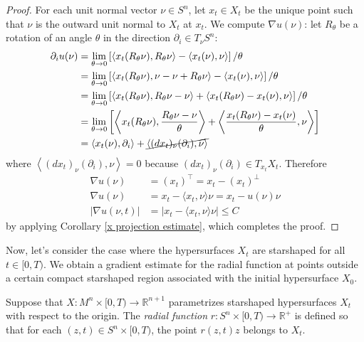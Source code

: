 \begin{proof} 
	For each unit normal vector $ \nu \in S^n $, let $ x_t \in X_t $ be the unique point such that $ \nu $ is the outward unit normal to $ X_t $ at $ x_t $. We compute $\nabla u(\nu)$: let $R_\theta$ be a rotation of an angle $\theta$ in the direction $\partial_i\in T_\nu S^n$:	
	\begin{align*}
		\partial_i u(\nu)  &= \lim_{\theta \rightarrow 0} \left[\langle x_t(R_\theta \nu) , R_\theta \nu\rangle - \langle x_t(\nu) ,  \nu\rangle\right]/\theta\\
		 &= \lim_{\theta \rightarrow 0} \left[\langle x_t(R_\theta \nu) , \nu - \nu + R_\theta \nu\rangle - \langle x_t(\nu) ,  \nu\rangle\right]/\theta\\
		 &= \lim_{\theta \rightarrow 0} \left[\langle x_t(R_\theta \nu) ,  R_\theta \nu - \nu\rangle + \langle  x_t(R_\theta \nu)  - x_t(\nu) ,  \nu\rangle\right]/\theta\\ 
		 &= \lim_{\theta \rightarrow 0}\left[ \left\langle x_t(R_\theta \nu) , \frac{ R_\theta \nu - \nu}{\theta}\right\rangle + \left\langle  \frac{x_t(R_\theta \nu)  - x_t(\nu)}{\theta} ,  \nu\right\rangle\right]\\
		 &= \left\langle x_t(\nu) , \partial_i\right\rangle + \cancel{\left\langle  (dx_t)_{\nu}(\partial_i),  \nu\right\rangle}
	\end{align*}
	where $\left\langle  (dx_t)_{\nu}(\partial_i),  \nu\right\rangle=0$ because $ (dx_t)_{\nu}(\partial_i) \in T_{x_t}X_t$. Therefore
	\begin{align*}
		\nabla u(\nu) &= (x_t)^\top =x_t - (x_t)^\bot \\
		\nabla u(\nu) &= x_t - \langle x_t , \nu\rangle \nu= x_t - u(\nu) \nu\\
		|\nabla u(\nu, t)| &= | x_t - \langle x_t , \nu\rangle \nu |\leq C 
	\end{align*}
	by applying Corollary \ref{x projection estimate},  which completes the proof.
\end{proof}


Now, let’s consider the case where the hypersurfaces $ X_t $ are starshaped for all $ t \in [0, T) $. We obtain a gradient estimate for the radial function at points outside a certain compact starshaped region associated with the initial hypersurface $ X_0 $.
\begin{defin}
	Suppose that $ X : M^n \times [0, T) \to \mathbb{R}^{n+1} $ parametrizes starshaped hypersurfaces $ X_t $ with respect to the origin. The {\em radial function} $ r : S^n \times [0, T) \to \mathbb{R}^+ $ is defined so that for each $ (z, t) \in S^n \times [0, T) $, the point $ r(z, t) z $ belongs to $ X_t $. 
\end{defin}

